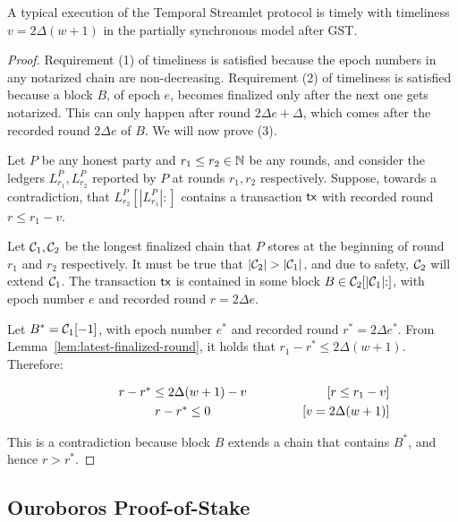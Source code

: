 \begin{theorem}
  A typical execution of the Temporal Streamlet protocol is timely
  with timeliness $v = 2\Delta (w + 1)$ in the partially synchronous model after GST.
\end{theorem}
\begin{proof}
  Requirement (1) of timeliness is satisfied because the epoch numbers in any notarized chain
  are non-decreasing.
  Requirement (2) of timeliness is satisfied because a block $B$, of epoch $e$, becomes finalized
  only after the next one gets notarized. This can only happen after round $2\Delta e + \Delta$,
  which comes after the recorded round $2\Delta e$ of $B$.
  We will now prove (3).

  Let $P$ be any honest party and $r_1 \leq r_2 \in \mathbb{N}$ be any rounds, and consider
  the ledgers $L^P_{r_1}, L^P_{r_2}$ reported by $P$ at rounds $r_1, r_2$ respectively.
  Suppose, towards a contradiction, that $L^P_{r_2}[|L^P_{r_1}|{:}]$ contains a transaction
  $\textsf{tx}$ with recorded round $r \leq r_1 - v$.

  Let $\mathcal{C}_1, \mathcal{C}_2$ be the longest finalized chain that $P$ stores at the beginning of round $r_1$
  and $r_2$ respectively.
  It must be true that $|\mathcal{C}_2| > |\mathcal{C}_1|$, and due to safety, $\mathcal{C}_2$ will extend $\mathcal{C}_1$.
  The transaction $\textsf{tx}$ is contained in some block $B \in \mathcal{C}_2[|\mathcal{C}_1|{:}]$,
  with epoch number $e$ and recorded round $r = 2\Delta e$.

  Let $B^* = \mathcal{C}_1[-1]$, with epoch number $e^*$ and recorded round $r^* = 2\Delta e^*$.
  From Lemma~\ref{lem:latest-finalized-round}, it holds that
  $r_1 - r^* \leq 2\Delta (w + 1)$. Therefore:

  \begin{align*}
    \makebox[0.5\textwidth][c]{$r - r^* \leq 2\Delta (w + 1) - v$}                && \text{[$r \leq r_1 - v$]} \\
    \makebox[0.5\textwidth][c]{$r - r^* \leq 0$}                                 && \text{[$v = 2\Delta (w + 1)$]}
  \end{align*}

  This is a contradiction because block $B$ extends a chain that contains $B^*$,
  and hence $r > r^*$.

  \Qed
\end{proof}


\subsection{Ouroboros Proof-of-Stake}

